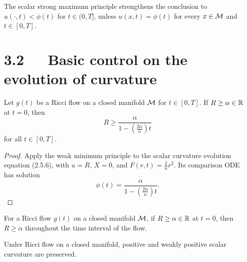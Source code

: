 \begin{remark}
\label{topping-maxpr-strong-maximum-principle}
The scalar strong maximum principle strengthens the conclusion to
$u(\cdot,t)<\phi(t)$ for $t\in(0,T]$, unless
$u(x,t)=\phi(t)$ for every $x\in\mathcal{M}$ and $t\in[0,T]$.
\end{remark}

\section*{3.2\ \ \ Basic control on the evolution of curvature}

\begin{theorem}
\label{topping-maxpr-scalar-lower-bound}

Let $g(t)$ be a Ricci flow on a closed manifold $\mathcal{M}$ for $t\in[0,T]$. If
$R\geq\alpha\in\mathbb{R}$ at $t=0$, then
\[
R\geq\frac{\alpha}{1-\left(\frac{2\alpha}{n}\right)t}
\]
for all $t\in[0,T]$.
\end{theorem}

\begin{proof}
\sketch Apply the weak minimum principle to the scalar curvature evolution
equation (2.5.6), with $u=R$, $X=0$, and $F(r,t)=\frac{2}{n}r^2$. Its
comparison ODE has solution
\[
\phi(t)=\frac{\alpha}{1-\left(\frac{2\alpha}{n}\right)t}.
\]
\end{proof}

\begin{corollary}
\label{topping-maxpr-scalar-preserved}
For a Ricci flow $g(t)$ on a closed manifold $\mathcal{M}$, if $R\geq\alpha\in\mathbb{R}$ at
$t=0$, then $R\geq\alpha$ throughout the time interval of the flow.
\end{corollary}

\begin{corollary}
\label{topping-maxpr-positive-scalar-preserved}
Under Ricci flow on a closed manifold, positive and weakly positive scalar
curvature are preserved.
\end{corollary}

